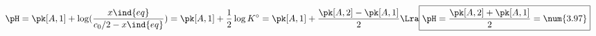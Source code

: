 \documentclass[a4paper, 10pt, final, garamond]{book}
\begin{document}
\begin{enumerate}[label=\sqenumi]
\begin{minipage}[t]{.80\linewidth}
{\begin{gather*}
				\pH = \pk[A,1] + \log ( \frac{x\ind{eq}}{c_0/2-x\ind{eq}} ) =
				\pk[A,1] + \frac{1}{2} \log K^\circ =
				\pk[A,1] + \frac{\pk[A,2]-\pk[A,1]}{2}
				\Lra
				\boxed{
					\pH = \frac{\pk[A,2]+\pk[A,1]}{2} =
					\num{3.97}
				}
			\end{gather*}
		}
	\end{minipage}
	\hfill
	\begin{minipage}[t]{.15\linewidth}
		\vspace{-40pt}
		\begin{center}
\end{center}
\end{minipage}
\end{enumerate}
\end{document}
